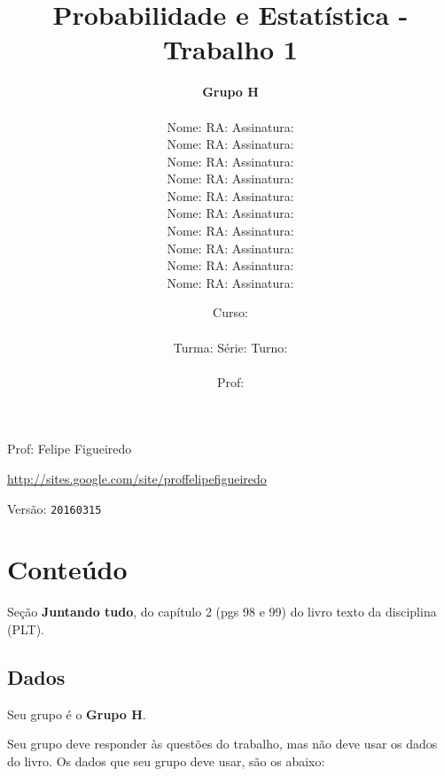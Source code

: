 \documentclass[a4paper]{article}
\date{
\bigskip
Curso: \underline{\hspace{8cm}}\\
\ \\
Turma: \underline{\hspace{1cm}} Série: \underline{\hspace{1cm}} Turno:
\underline{\hspace{1cm}}\\
\ \\
Prof: \underline{\hspace{8cm}}\\
}
\title{Probabilidade e Estatística - Trabalho 1}
\author{
{\bf Grupo H}\\
\ \\
Nome: \underline{\hspace{6cm}} RA: \underline{\hspace{2cm}} Assinatura: \underline{\hspace{4cm}}\\
Nome: \underline{\hspace{6cm}} RA: \underline{\hspace{2cm}} Assinatura: \underline{\hspace{4cm}}\\
Nome: \underline{\hspace{6cm}} RA: \underline{\hspace{2cm}} Assinatura: \underline{\hspace{4cm}}\\
Nome: \underline{\hspace{6cm}} RA: \underline{\hspace{2cm}} Assinatura: \underline{\hspace{4cm}}\\
Nome: \underline{\hspace{6cm}} RA: \underline{\hspace{2cm}} Assinatura: \underline{\hspace{4cm}}\\
Nome: \underline{\hspace{6cm}} RA: \underline{\hspace{2cm}} Assinatura: \underline{\hspace{4cm}}\\
Nome: \underline{\hspace{6cm}} RA: \underline{\hspace{2cm}} Assinatura: \underline{\hspace{4cm}}\\
Nome: \underline{\hspace{6cm}} RA: \underline{\hspace{2cm}} Assinatura: \underline{\hspace{4cm}}\\
Nome: \underline{\hspace{6cm}} RA: \underline{\hspace{2cm}} Assinatura: \underline{\hspace{4cm}}\\
Nome: \underline{\hspace{6cm}} RA: \underline{\hspace{2cm}} Assinatura: \underline{\hspace{4cm}}\\
}
\begin{document}
\maketitle
\newpage

\parbox[c]{.825\textwidth}{\raggedright%
{Prof: Felipe Figueiredo\par}
{\url{http://sites.google.com/site/proffelipefigueiredo}\par}
}

Versão: \verb|20160315|




\section{Conteúdo}

Seção {\bf Juntando tudo}, do capítulo 2 (pgs 98 e 99) do livro texto da disciplina (PLT). 

\subsection{Dados}
Seu grupo é o {\bf Grupo H}.

Seu grupo deve responder às questões do trabalho, mas não deve usar os dados do livro. Os dados que seu grupo deve usar, são os abaixo:
\end{document}
